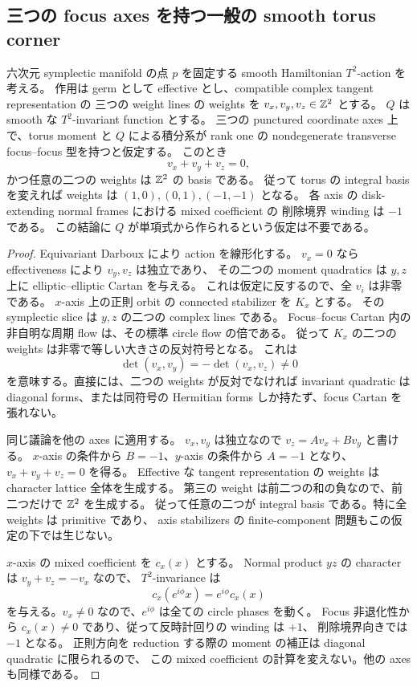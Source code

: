 \subsection{三つの focus axes を持つ一般の smooth torus corner}

\begin{theorem}\label{cw:torus-rigidity}
六次元 symplectic manifold の点 $p$ を固定する smooth Hamiltonian $T^2$-action を考える。
作用は germ として effective とし、compatible complex tangent representation の
三つの weight lines の weights を $v_x,v_y,v_z\in\mathbb Z^2$ とする。
$Q$ は smooth な $T^2$-invariant function とする。
三つの punctured coordinate axes 上で、torus moment と $Q$ による積分系が
rank one の nondegenerate transverse focus--focus 型を持つと仮定する。
このとき
\[
 v_x+v_y+v_z=0,
\]
かつ任意の二つの weights は $\mathbb Z^2$ の basis である。
従って torus の integral basis を変えれば weights は
$(1,0),(0,1),(-1,-1)$ となる。
各 axis の disk-extending normal frames における mixed coefficient の
削除境界 winding は $-1$ である。
この結論に $Q$ が単項式から作られるという仮定は不要である。
\end{theorem}

\begin{proof}
Equivariant Darboux により action を線形化する。
$v_x=0$ なら effectiveness により $v_y,v_z$ は独立であり、
その二つの moment quadratics は $y,z$ 上に elliptic--elliptic Cartan を与える。
これは仮定に反するので、全 $v_i$ は非零である。
$x$-axis 上の正則 orbit の connected stabilizer を $K_x$ とする。
その symplectic slice は $y,z$ の二つの complex lines である。
Focus--focus Cartan 内の非自明な周期 flow は、その標準 circle flow の倍である。
従って $K_x$ の二つの weights は非零で等しい大きさの反対符号となる。
これは
\[
 \det(v_x,v_y)=-\det(v_x,v_z)\ne0
\]
を意味する。直接には、二つの weights が反対でなければ invariant quadratic は
diagonal forms、または同符号の Hermitian forms しか持たず、focus Cartan を張れない。

同じ議論を他の axes に適用する。
$v_x,v_y$ は独立なので $v_z=A v_x+B v_y$ と書ける。
$x$-axis の条件から $B=-1$、$y$-axis の条件から $A=-1$ となり、
$v_x+v_y+v_z=0$ を得る。
Effective な tangent representation の weights は character lattice 全体を生成する。
第三の weight は前二つの和の負なので、前二つだけで $\mathbb Z^2$ を生成する。
従って任意の二つが integral basis である。特に全 weights は primitive であり、
axis stabilizers の finite-component 問題もこの仮定の下では生じない。

$x$-axis の mixed coefficient を $c_x(x)$ とする。
Normal product $yz$ の character は $v_y+v_z=-v_x$ なので、
$T^2$-invariance は
\[
 c_x(e^{i\phi}x)=e^{i\phi}c_x(x)
\]
を与える。$v_x\ne0$ なので、$e^{i\phi}$ は全ての circle phases を動く。
Focus 非退化性から $c_x(x)\ne0$ であり、従って反時計回りの winding は $+1$、
削除境界向きでは $-1$ となる。
正則方向を reduction する際の moment の補正は diagonal quadratic に限られるので、
この mixed coefficient の計算を変えない。他の axes も同様である。
\end{proof}

